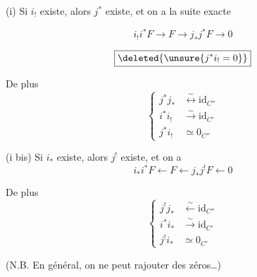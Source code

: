 (i) Si $i_!$ existe, alors $j^*$ existe, et on a la suite exacte


\[
\boxed{i_!i^*F\longrightarrow F\longrightarrow j_*j^*F\longrightarrow 0}
\]

\[
\boxed{\deleted{\unsure{j^*i_!=0}}}
\]

De plus
\[
\left\{\begin{aligned}
j^*j_*&\overset{\sim}{\longleftrightarrow}\mathrm{id}_{C''}\\
i^*i_!&\xrightarrow{\sim}\mathrm{id}_{C'}\\
j^*i_!&\simeq 0_{C''}
\end{aligned}\right.
\]

(i bis) Si $i_*$ existe, alors $j^!$ existe, et on a
\[
i_*i^*F\longleftarrow F\longleftarrow j_*j^!F\longleftarrow 0
\]

De plus
\[
\left\{\begin{aligned}
j^!j_*&\xleftarrow{\sim}\mathrm{id}_{C''}\\
i^*i_*&\xrightarrow{\sim}\mathrm{id}_{C'}\\
j^!i_*&\simeq 0_{C'}
\end{aligned}\right.
\]


(N.B. En général, on ne peut rajouter des zéros\ldots)

